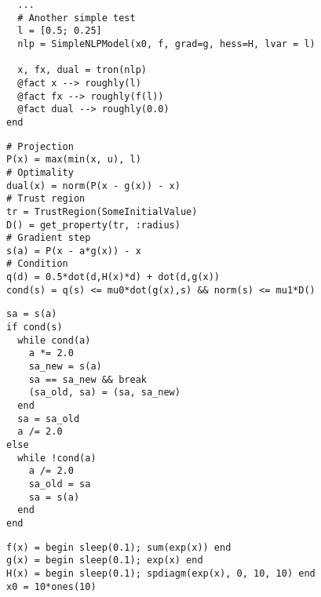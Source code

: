 \begin{frame}[t,fragile]
  \begin{verbatim}
  ...
  # Another simple test
  l = [0.5; 0.25]
  nlp = SimpleNLPModel(x0, f, grad=g, hess=H, lvar = l)

  x, fx, dual = tron(nlp)
  @fact x --> roughly(l)
  @fact fx --> roughly(f(l))
  @fact dual --> roughly(0.0)
end
\end{verbatim}
\end{frame}

\begin{frame}[t,fragile]
  \begin{verbatim}
# Projection
P(x) = max(min(x, u), l)
# Optimality
dual(x) = norm(P(x - g(x)) - x)
# Trust region
tr = TrustRegion(SomeInitialValue)
D() = get_property(tr, :radius)
# Gradient step
s(a) = P(x - a*g(x)) - x
# Condition
q(d) = 0.5*dot(d,H(x)*d) + dot(d,g(x))
cond(s) = q(s) <= mu0*dot(g(x),s) && norm(s) <= mu1*D()
\end{verbatim}
\end{frame}

\begin{frame}[t,fragile]
  \begin{verbatim}
sa = s(a)
if cond(s)
  while cond(a)
    a *= 2.0
    sa_new = s(a)
    sa == sa_new && break
    (sa_old, sa) = (sa, sa_new)
  end
  sa = sa_old
  a /= 2.0
else
  while !cond(a)
    a /= 2.0
    sa_old = sa
    sa = s(a)
  end
end
\end{verbatim}
\end{frame}


\begin{frame}[t,fragile]
  \begin{verbatim}
f(x) = begin sleep(0.1); sum(exp(x)) end
g(x) = begin sleep(0.1); exp(x) end
H(x) = begin sleep(0.1); spdiagm(exp(x), 0, 10, 10) end
x0 = 10*ones(10)
\end{verbatim}
\end{frame}

